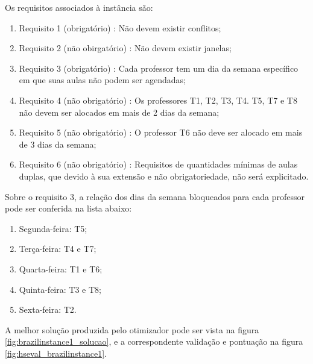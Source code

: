 Os requisitos associados à instância são:
\begin{enumerate}
	\item Requisito 1 (obrigatório) : Não devem existir conflitos;
	\item Requisito 2 (não obirgatório) : Não devem existir janelas;
	\item Requisito 3 (obrigatório) : Cada professor tem um dia da semana específico em que suas aulas não podem ser agendadas;
	\item Requisito 4 (não obrigatório) : Os professores T1, T2, T3, T4. T5, T7 e T8 não devem ser alocados em mais de 2 dias da semana;
	\item Requisito 5 (não obrigatório) : O professor T6 não deve ser alocado em mais de 3 dias da semana;
	\item Requisito 6 (não obrigatório) : Requisitos de quantidades mínimas de aulas duplas, que devido à sua extensão e não obrigatoriedade, não será explicitado.
\end{enumerate}

Sobre o requisito 3, a relação dos dias da semana bloqueados para cada professor pode ser conferida na lista abaixo:
\begin{enumerate}
	\item Segunda-feira: T5;
	\item Terça-feira: T4 e T7;
	\item Quarta-feira: T1 e T6;
	\item Quinta-feira: T3 e T8;
	\item Sexta-feira: T2.
\end{enumerate}

A melhor solução produzida pelo otimizador pode ser vista na figura \ref{fig:brazilinstance1_solucao}, e a correspondente validação e pontuação na figura \ref{fig:hseval_brazilinstance1}.

